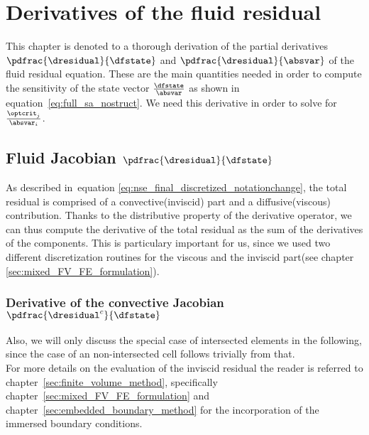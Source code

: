 \documentclass[../main.tex]{subfiles}
\begin{document}
\setlength{\delimitershortfall}{0pt}

\chapter{Derivatives of the fluid residual}\label{sec:dresidual_derivative}
\minitoc

This chapter is denoted to a thorough derivation of the partial derivatives $\pdfrac{\dresidual}{\dfstate}$ and $\pdfrac{\dresidual}{\absvar}$ of the fluid residual equation.
These are the main quantities needed in order to compute the sensitivity of the state vector $\tfrac{\dfstate}{\absvar}$ as shown in equation~\eqref{eq:full_sa_nostruct}.
We need this derivative in order to solve for $\tfrac{\optcrit_{j}}{\absvar_{i}}$.\\


\section{Fluid Jacobian $\pdfrac{\dresidual}{\dfstate}$}\label{sec:fluid_jacobian}





As described in~equation \eqref{eq:nse_final_discretized_notationchange}, the total residual is comprised of a convective(inviscid) part and a diffusive(viscous) contribution. Thanks to the distributive property of the derivative operator, we can thus compute the derivative of the total residual as the sum of the derivatives of the components. This is particulary important for us, since we used two different discretization routines for the viscous and the inviscid part(see chapter \ref{sec:mixed_FV_FE_formulation}).\\



\subsection{Derivative of the convective Jacobian $\pdfrac{\dresidual^c}{\dfstate}$}

Also, we will only discuss the special case of intersected elements in the following, since the case of an non-intersected cell follows trivially from that.\\
For more details on the evaluation of the inviscid residual the reader is referred to chapter~\ref{sec:finite_volume_method}, specifically chapter~\ref{sec:mixed_FV_FE_formulation} and chapter~\ref{sec:embedded_boundary_method} for the incorporation of the immersed boundary conditions.
\end{document}

